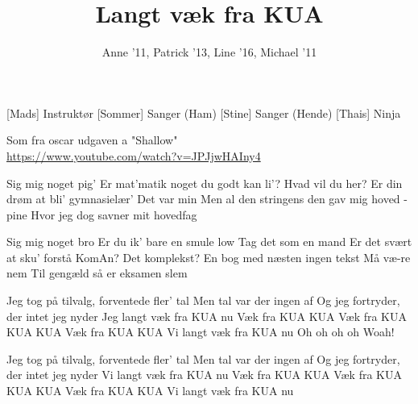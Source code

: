\documentclass[a4paper,11pt]{article}
\title{Langt væk fra KUA}
\author{Anne '11, Patrick '13, Line '16, Michael '11}
\begin{document}
\maketitle

\begin{roles}
[Mads] Instruktør
[Sommer] Sanger (Ham)
[Stine] Sanger (Hende)
[Thais] Ninja

\end{roles}

\begin{props}
     Som fra oscar udgaven a "Shallow" \\ \url{https://www.youtube.com/watch?v=JPJjwHAIny4}
\end{props}

\begin{song}
 Sig mig noget pig'
Er mat'matik noget du godt kan li'?
Hvad vil du her?
Er din drøm at bli' gymnasielær'
Det var min
Men al den stringens den gav mig
hoved - pine
Hvor jeg dog savner mit hovedfag

 Sig mig noget bro
Er du ik' bare en smule low
Tag det som en mand
Er det svært at sku' forstå KomAn?
 Det komplekst?
 En bog med næsten ingen tekst
Må væ-re nem
 Til gengæld så er eksamen slem

 Jeg tog på tilvalg, forventede fler' tal
Men tal var der ingen af
Og jeg fortryder, der intet jeg nyder
Jeg langt væk fra KUA nu
Væk fra KUA KUA
Væk fra KUA KUA KUA
Væk fra KUA KUA
Vi langt væk fra KUA nu
Oh oh oh oh
Woah!


 Jeg tog på tilvalg, forventede fler' tal
Men tal var der ingen af
Og jeg fortryder, der intet jeg nyder
Vi langt væk fra KUA nu
Væk fra KUA KUA
Væk fra KUA KUA KUA
Væk fra KUA KUA
Vi langt væk fra KUA nu
\end{song}
\end{document}
